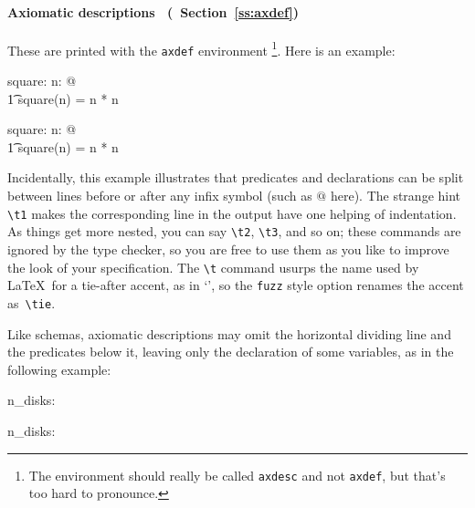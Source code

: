 \paragraph{Axiomatic descriptions%
        \ifmanual\ \rm (\ZRM\ Section~\protect\ref{ss:axdef})\fi}%
These are printed with the \verb/axdef/ environment%
\footnote{The
environment should really be called \verb/axdesc/ and not
\verb/axdef/, but that's too hard to pronounce.}.  Here is an
example:
\begin{demo}
\begin{axdef}
    square: \nat \fun \nat
\where
    \forall n: \nat @ \\
\t1     square(n) = n * n
\end{axdef}
\gives
\begin{axdef}
    square: \nat \fun \nat
\where
    \forall n: \nat @ \\
\t1     square(n) = n * n
\end{axdef}
\end{demo}
Incidentally, this example illustrates that predicates and
declarations can be split between lines before or after any infix
symbol (such as $@$ here).  The strange hint \verb/\t1/\index{|\t|}
makes the corresponding line in the output have one helping of
indentation.  As things get more nested, you can say \verb/\t2/,
\verb/\t3/, and so on; these commands are ignored by the type
checker, so you are free to use them as you like to improve the look
of your specification.  The \verb/\t/ command usurps the name used by
\LaTeX\ for a tie-after accent,
as in `', so the \verb/fuzz/ style option renames the accent
as~\verb/\tie/.

Like schemas, axiomatic descriptions may omit the horizontal
dividing line and the predicates below it, leaving only the
declaration of some variables, as in the following example:
\begin{demo}
\begin{axdef}
    n\_disks: \nat
\end{axdef}
\gives
\begin{axdef}
    n\_disks: \nat
\end{axdef}
\end{demo}


